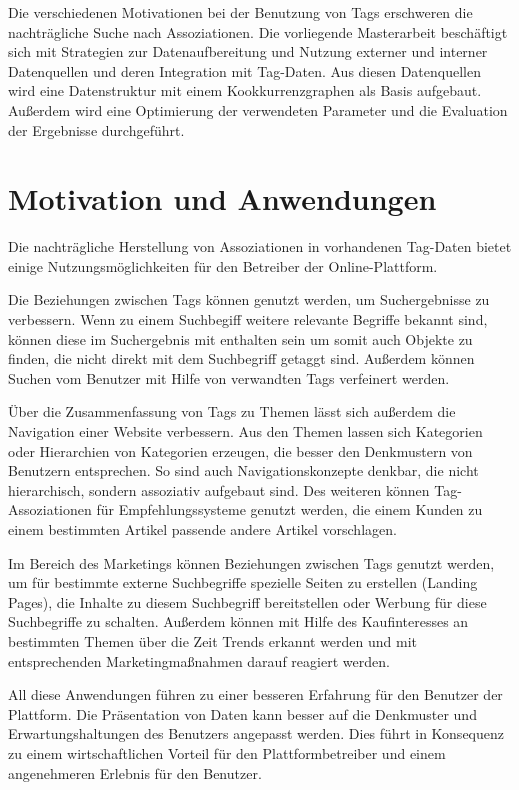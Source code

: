 Die verschiedenen Motivationen bei der Benutzung von Tags erschweren die nachträgliche Suche nach Assoziationen. Die vorliegende Masterarbeit beschäftigt sich mit Strategien zur Datenaufbereitung und Nutzung externer und interner Datenquellen und deren Integration mit Tag-Daten. Aus diesen Datenquellen wird eine Datenstruktur mit einem Kookkurrenzgraphen als Basis aufgebaut. Außerdem wird eine Optimierung der verwendeten Parameter und die Evaluation der Ergebnisse durchgeführt.

\section{Motivation und Anwendungen}

Die nachträgliche Herstellung von Assoziationen in vorhandenen Tag-Daten bietet einige Nutzungsmöglichkeiten für den Betreiber der Online-Plattform.

Die Beziehungen zwischen Tags können genutzt werden, um Suchergebnisse zu verbessern. Wenn zu einem Suchbegiff weitere relevante Begriffe bekannt sind, können diese im Suchergebnis mit enthalten sein um somit auch Objekte zu finden, die nicht direkt mit dem Suchbegriff getaggt sind. Außerdem können Suchen vom Benutzer mit Hilfe von verwandten Tags verfeinert werden.

Über die Zusammenfassung von Tags zu Themen lässt sich außerdem die Navigation einer Website verbessern. Aus den Themen lassen sich Kategorien oder Hierarchien von Kategorien erzeugen, die besser den Denkmustern von Benutzern entsprechen. So sind auch Navigationskonzepte denkbar, die nicht hierarchisch, sondern assoziativ aufgebaut sind. Des weiteren können Tag-Assoziationen für Empfehlungssysteme genutzt werden, die einem Kunden zu einem bestimmten Artikel passende andere Artikel vorschlagen.

Im Bereich des Marketings können Beziehungen zwischen Tags genutzt werden, um für bestimmte externe Suchbegriffe spezielle Seiten zu erstellen (Landing Pages), die Inhalte zu diesem Suchbegriff bereitstellen oder Werbung für diese Suchbegriffe zu schalten. Außerdem können mit Hilfe des Kaufinteresses an bestimmten Themen über die Zeit Trends erkannt werden und mit entsprechenden Marketingmaßnahmen darauf reagiert werden.

All diese Anwendungen führen zu einer besseren Erfahrung für den Benutzer der Plattform. Die Präsentation von Daten kann besser auf die Denkmuster und Erwartungshaltungen des Benutzers angepasst werden. Dies führt in Konsequenz zu einem wirtschaftlichen Vorteil für den Plattformbetreiber und einem angenehmeren Erlebnis für den Benutzer.

